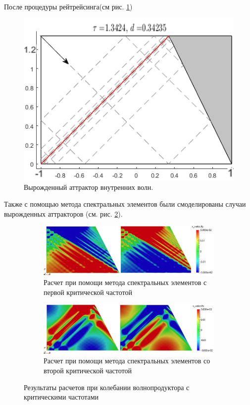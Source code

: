 После процедуры рейтрейсинга(см рис. \ref{fig:attrTriv})
    
\begin{figure}
    \centering
    \includegraphics[scale=0.6]{Figs/AttrCritFreq.png}
    \caption{Вырожденный аттрактор внутренних волн.}
    \label{fig:attrTriv}
\end{figure}


Также с помощью метода спектральных элементов были смоделированы случаи вырожденных аттракторов (см. рис. \ref{fig:critNekfr}).

\begin{figure}
    \centering
    
    \begin{subfigure}[с]{1\textwidth}
        \includegraphics[scale=0.45]{Figs/AttrNEKcrit1.png}
        \caption{Расчет при помощи метода спектральных элементов с первой критической частотой}
    \end{subfigure}
    
    \begin{subfigure}[r]{1\textwidth}
        \includegraphics[scale=0.45]{Figs/AttrNekCrit2.png}
        \caption{Расчет при помощи метода спектральных элементов со второй критической частотой}
    \end{subfigure}
    \caption{Результаты расчетов при колебании волнопродуктора с критическими частотами}
    \label{fig:critNekfr}
\end{figure}

